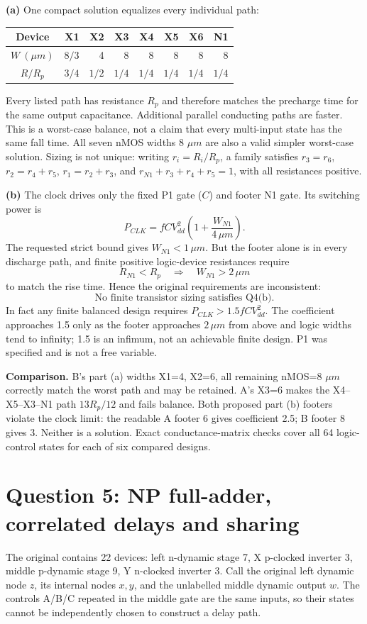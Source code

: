 \documentclass[10pt]{article}
\begin{document}
\textbf{(a)} One compact solution equalizes every individual path:
\begin{center}\begin{tabular}{c|rrrrrrr}\toprule
Device&X1&X2&X3&X4&X5&X6&N1\\\midrule
$W\ (\mu m)$&$8/3$&4&8&8&8&8&8\\
$R/R_p$&$3/4$&$1/2$&$1/4$&$1/4$&$1/4$&$1/4$&$1/4$\\\bottomrule
\end{tabular}\end{center}
Every listed path has resistance $R_p$ and therefore matches the precharge time for the same output capacitance. Additional parallel conducting paths are faster. This is a worst-case balance, not a claim that every multi-input state has the same fall time. All seven nMOS widths 8 $\mu m$ are also a valid simpler worst-case solution. Sizing is not unique: writing $r_i=R_i/R_p$, a family satisfies $r_3=r_6$, $r_2=r_4+r_5$, $r_1=r_2+r_3$, and $r_{N1}+r_3+r_4+r_5=1$, with all resistances positive.

\textbf{(b)} The clock drives only the fixed P1 gate ($C$) and footer N1 gate. Its switching power is
\[P_{CLK}=fCV_{dd}^2\left(1+\frac{W_{N1}}{4\,\mu m}\right).\]
The requested strict bound gives $W_{N1}<1\,\mu m$. But the footer alone is in every discharge path, and finite positive logic-device resistances require
\[R_{N1}<R_p\quad\Longrightarrow\quad W_{N1}>2\,\mu m\]
to match the rise time. Hence the original requirements are inconsistent:
\[\boxed{\text{No finite transistor sizing satisfies Q4(b).}}\]
In fact any finite balanced design requires $P_{CLK}>1.5fCV_{dd}^2$. The coefficient approaches 1.5 only as the footer approaches $2\,\mu m$ from above and logic widths tend to infinity; 1.5 is an infimum, not an achievable finite design. P1 was specified and is not a free variable.

\textbf{Comparison.} B's part (a) widths X1=4, X2=6, all remaining nMOS=8 $\mu m$ correctly match the worst path and may be retained. A's X3=6 makes the X4--X5--X3--N1 path $13R_p/12$ and fails balance. Both proposed part (b) footers violate the clock limit: the readable A footer 6 gives coefficient 2.5; B footer 8 gives 3. Neither is a solution. Exact conductance-matrix checks cover all 64 logic-control states for each of six compared designs.

\newpage\section*{Question 5: NP full-adder, correlated delays and sharing}
The original contains 22 devices: left n-dynamic stage 7, X p-clocked inverter 3, middle p-dynamic stage 9, Y n-clocked inverter 3. Call the original left dynamic node $z$, its internal nodes $x,y$, and the unlabelled middle dynamic output $w$. The controls A/B/C repeated in the middle gate are the same inputs, so their states cannot be independently chosen to construct a delay path.
\end{document}

